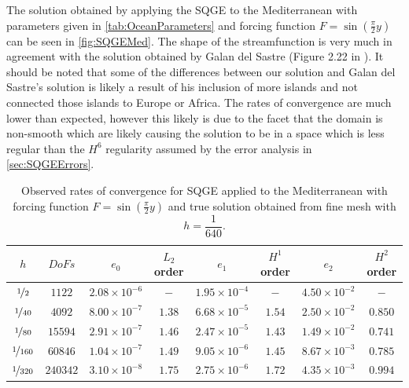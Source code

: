 The solution obtained by applying the SQGE to the Mediterranean with parameters
given in \autoref{tab:OceanParameters} and forcing function $F =
\sin(\frac{\pi}{2} y)$ can be seen in \autoref{fig:SQGEMed}. The shape of the
streamfunction is very much in agreement with the solution obtained by Galan del
Sastre (Figure 2.22 in \cite{Galan-del-Sastre2004}). It should be noted that
some of the differences between our solution and Galan del Sastre's solution is
likely a result of his inclusion of more islands and not connected those islands
to Europe or Africa. The rates of convergence are much lower than expected,
however this likely is due to the facet that the domain is non-smooth which are
likely causing the solution to be in a space which is less regular than the
$H^6$ regularity \cite{Soane2010} assumed by the error analysis in
\autoref{sec:SQGEErrors}.

\begin{table}
\begin{tabular}{|c|c|c|c|c|c|c|c|}%
  \hline
  $h$ & $DoFs$ & $e_0$ & $L_2$ order & $e_1$ & $H^1$ order & $e_2$ & $H^2$ order \\[0.2em]
  \hline
  $\nicefrac{1}{2}$ & $1122$ & $2.08\times 10^{-6}$ & $-$ & $1.95\times 10^{-4}$ & $-$ & $4.50\times 10^{-2}$ & $-$ \\
  $\nicefrac{1}{40}$ & $4092$ & $8.00\times 10^{-7}$ & $1.38$ & $6.68\times 10^{-5}$ & $1.54$ & $2.50\times 10^{-2}$ & $0.850$ \\
  $\nicefrac{1}{80}$ & $15594$ & $2.91\times 10^{-7}$ & $1.46$ & $2.47\times 10^{-5}$ & $1.43$ & $1.49\times 10^{-2}$ & $0.741$ \\
  $\nicefrac{1}{160}$ & $60846$ & $1.04\times 10^{-7}$ & $1.49$ & $9.05\times 10^{-6}$ & $1.45$ & $8.67\times 10^{-3}$ & $0.785$ \\
  $\nicefrac{1}{320}$ & $240342$ & $3.10\times 10^{-8}$ & $1.75$ & $2.75\times 10^{-6}$ & $1.72$ & $4.35\times 10^{-3}$ & $0.994$ \\
\hline
\end{tabular}
\caption{Observed rates of convergence for SQGE applied to the Mediterranean
  with forcing function $F = \sin(\frac{\pi}{2} y)$ and true solution obtained
  from fine mesh with $h=\dfrac{1}{640}$.}
  \label{tab:SQGEMedConvergence}
\end{table}

